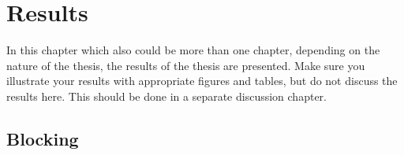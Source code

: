 
\chapter{Results}
  \label{results}

In this chapter which also could be more than one chapter, depending on the nature of the thesis, the results of the thesis are presented.
Make sure you illustrate your results with appropriate figures and tables, but do not discuss the results here.
This should be done in a separate discussion chapter.

\section{Blocking}

\clearpage
